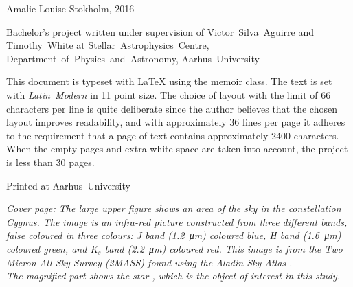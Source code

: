 \begin{titlingpage}
 \projecttitle
 \newpage



\clearpage
{}
\thispagestyle{empty} %
\small
\strut\vfill %
\begin{flushleft}
\projecttitle \par \projecttitledanish \par \vspace{11 pt}
Amalie Louise Stokholm, 2016 \par
Bachelor's project written under supervision of Victor~Silva~Aguirre and Timothy~White at Stellar~Astrophysics~Centre, Department~of~Physics~and~Astronomy, Aarhus~University \par\vspace{11 pt}
This document is typeset with \LaTeX\xspace using the \textsf{memoir} class. The text is set with \emph{Latin~Modern} in 11 point size. The choice of layout with the limit of 66 characters per line is quite deliberate since the author believes that the chosen layout improves readability, and with approximately 36 lines per page it adheres to the requirement that a page of text contains approximately 2400 characters. When the empty pages and extra white space are taken into account, the project is less than 30 pages. \par
\vspace{11 pt}
Printed at Aarhus~University \par\vspace{11 pt}
\emph{Cover page: The large upper figure shows an area of the sky in the constellation \emph{Cygnus}. The image is an infra-red picture constructed from three different bands, false coloured in three colours: J band (\SI{1.2}{\micro\meter}) coloured blue, H band (\SI{1.6}{\micro\meter}) coloured green, and K$_s$ band (\SI{2.2}{\micro\meter}) coloured red. This image is from the Two Micron All Sky Survey (2MASS) \citep{mass} found using the Aladin Sky Atlas \citep{aladin}. \\ The magnified part shows the star \mystar, which is the object of interest in this study.} 
\end{flushleft}
\end{titlingpage}
\restoregeometry